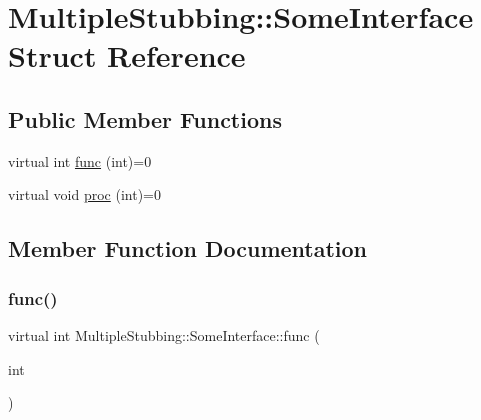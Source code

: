 \hypertarget{structMultipleStubbing_1_1SomeInterface}{}\section{Multiple\+Stubbing\+::Some\+Interface Struct Reference}
\label{structMultipleStubbing_1_1SomeInterface}
\subsection*{Public Member Functions}
\begin{DoxyCompactItemize}
\item 
virtual int \mbox{\hyperlink{structMultipleStubbing_1_1SomeInterface_acd49fee9bf774132801b9eaae8bb2877}{func}} (int)=0
\item 
virtual void \mbox{\hyperlink{structMultipleStubbing_1_1SomeInterface_a94d0ad8865f7e09641e74813958c2e34}{proc}} (int)=0
\end{DoxyCompactItemize}


\subsection{Member Function Documentation}
\mbox{\label{structMultipleStubbing_1_1SomeInterface_acd49fee9bf774132801b9eaae8bb2877}} 
\subsubsection{\texorpdfstring{func()}{func()}}
{\footnotesize\ttfamily virtual int Multiple\+Stubbing\+::\+Some\+Interface\+::func (\begin{DoxyParamCaption}\item[{int}]{ }\end{DoxyParamCaption})\hspace{0.3cm}{\ttfamily [pure virtual]}}

\mbox{\label{structMultipleStubbing_1_1SomeInterface_a94d0ad8865f7e09641e74813958c2e34}} 
